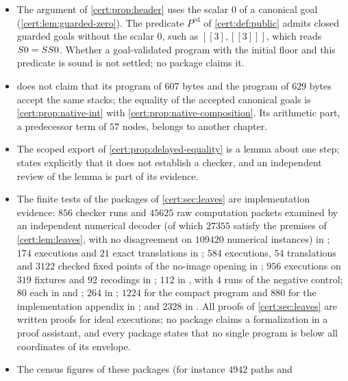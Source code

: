 \begin{itemize}
(\cref{cert:rem:header-native}) is part of its test data and is not displayed
in its report; the unsoundness of these variants is therefore recorded here as
the package's claim, with the mechanism described in the remark.
\item The argument of \cref{cert:prop:header} uses the scalar $0$ of a canonical
goal (\cref{cert:lem:guarded-zero}). The predicate $P^{\mathrm{ed}}$ of
\cref{cert:def:public} admits closed guarded goals without the scalar $0$,
such as $[[3],[[3]]]$, which reads $S 0=SS 0$. Whether a goal-validated
program with the initial floor and this predicate is sound is not settled; no
package claims it.
\item {} does not claim that its program of $607$ bytes
and the program of $629$ bytes accept the same stacks; the equality of the
accepted canonical goals is \cref{cert:prop:native-int} with
\cref{cert:prop:native-composition}. Its arithmetic part, a predecessor term of
$57$ nodes, belongs to another chapter.
\item The scoped export of \cref{cert:prop:delayed-equality} is a lemma about
one step;  states explicitly that it does not establish
a checker, and an independent review of the lemma is part of its evidence.
\item The finite tests of the packages of \cref{cert:sec:leaves} are
implementation evidence: $856$ checker runs and $45625$ raw computation packets
examined by an independent numerical decoder (of which $27355$ satisfy the
premises of \cref{cert:lem:leaves}, with no disagreement on $109420$ numerical
instances) in ; $174$ executions and $21$ exact
translations in ; $584$ executions, $54$ translations and
$3122$ checked fixed points of the no-image opening in ;
$956$ executions on $319$ fixtures and $92$ recodings in
; $112$ in , with $4$
runs of the negative control; $80$ each in 
and ; $264$ in ;
$1224$ for the compact program and $880$ for the implementation appendix in
; and $2328$ in .
All proofs of \cref{cert:sec:leaves} are written proofs for ideal executions;
no package claims a formalization in a proof assistant, and every package
states that no single program is below all coordinates of its envelope.
\item The census figures of these packages (for instance $4942$ paths and

\end{itemize}
